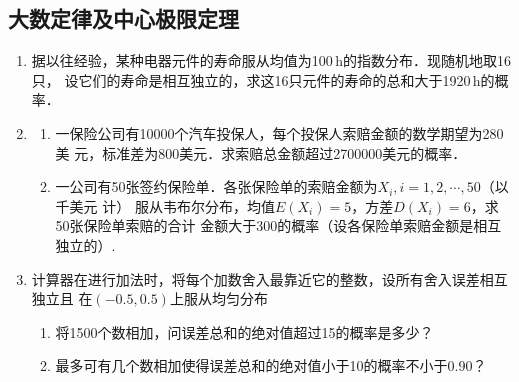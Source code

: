 \subsection{大数定律及中心极限定理}

\begin{enumerate}

    
        
    



    \item 据以往经验，某种电器元件的寿命服从均值为100$\, $h的指数分布．现随机地取16只，
    设它们的寿命是相互独立的，求这16只元件的寿命的总和大于1920$\, $h的概率．
        

    \item \begin{enumerate}
        \item 一保险公司有10000个汽车投保人，每个投保人索赔金额的数学期望为280美
        元，标准差为800美元．求索赔总金额超过2700000美元的概率．
        \item 一公司有50张签约保险单．各张保险单的索赔金额为$X_i,i=1,2,\cdots,50$（以千美元
        计） 服从韦布尔分布，均值$E(X_i)=5$，方差$D(X_i)=6$，求50张保险单索赔的合计
        金额大于300的概率（设各保险单索赔金额是相互独立的）.
    \end{enumerate}


    \item 计算器在进行加法时，将每个加数舍入最靠近它的整数，设所有舍入误差相互独立且
    在$(-0.5,0.5)$上服从均匀分布
    \begin{enumerate}
        \item 将1500个数相加，问误差总和的绝对值超过15的概率是多少？
        \item 最多可有几个数相加使得误差总和的绝对值小于10的概率不小于0.90？
    \end{enumerate}




\end{enumerate}
